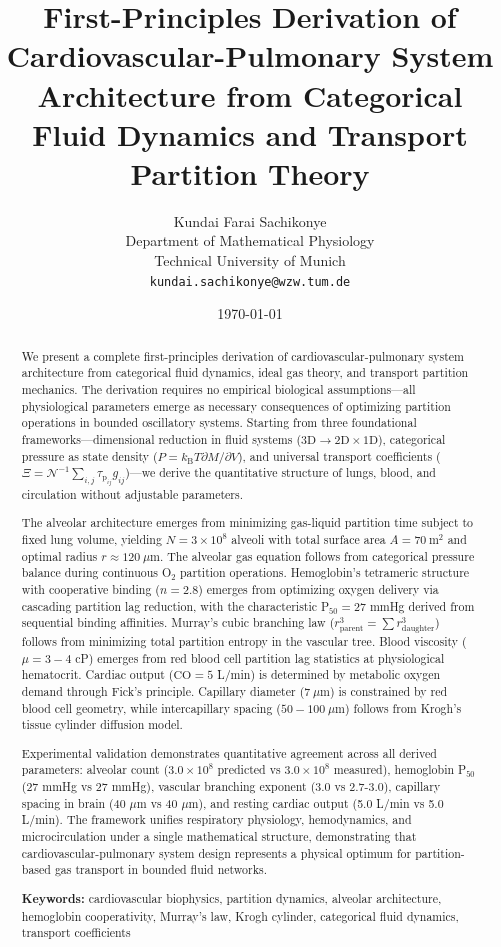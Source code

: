 \documentclass[12pt,a4paper]{article}
\title{\textbf{First-Principles Derivation of Cardiovascular-Pulmonary System Architecture from Categorical Fluid Dynamics and Transport Partition Theory}}
\author{
Kundai Farai Sachikonye\\
Department of Mathematical Physiology\\
Technical University of Munich\\
\texttt{kundai.sachikonye@wzw.tum.de}
}
\date{\today}
\theoremstyle{remark}
\newcommand{\kB}{k_{\mathrm{B}}}
\newcommand{\taulag}{\tau_{\mathrm{p}}}
\begin{document}
\maketitle

\begin{abstract}
We present a complete first-principles derivation of cardiovascular-pulmonary system architecture from categorical fluid dynamics, ideal gas theory, and transport partition mechanics. The derivation requires no empirical biological assumptions—all physiological parameters emerge as necessary consequences of optimizing partition operations in bounded oscillatory systems. Starting from three foundational frameworks—dimensional reduction in fluid systems ($3\mathrm{D} \to 2\mathrm{D} \times 1\mathrm{D}$), categorical pressure as state density ($P = \kB T \partial M/\partial V$), and universal transport coefficients ($\Xi = \mathcal{N}^{-1} \sum_{i,j} \taulag_{ij} g_{ij}$)—we derive the quantitative structure of lungs, blood, and circulation without adjustable parameters.

The alveolar architecture emerges from minimizing gas-liquid partition time subject to fixed lung volume, yielding $N = 3 \times 10^{8}$ alveoli with total surface area $A = 70~\mathrm{m}^{2}$ and optimal radius $r \approx 120~\mu\mathrm{m}$. The alveolar gas equation follows from categorical pressure balance during continuous O$_{2}$ partition operations. Hemoglobin's tetrameric structure with cooperative binding ($n = 2.8$) emerges from optimizing oxygen delivery via cascading partition lag reduction, with the characteristic P$_{50} = 27$ mmHg derived from sequential binding affinities. Murray's cubic branching law ($r_{\mathrm{parent}}^{3} = \sum r_{\mathrm{daughter}}^{3}$) follows from minimizing total partition entropy in the vascular tree. Blood viscosity ($\mu = 3-4$ cP) emerges from red blood cell partition lag statistics at physiological hematocrit. Cardiac output ($\mathrm{CO} = 5$ L/min) is determined by metabolic oxygen demand through Fick's principle. Capillary diameter ($7~\mu\mathrm{m}$) is constrained by red blood cell geometry, while intercapillary spacing ($50-100~\mu\mathrm{m}$) follows from Krogh's tissue cylinder diffusion model.

Experimental validation demonstrates quantitative agreement across all derived parameters: alveolar count ($3.0 \times 10^{8}$ predicted vs $3.0 \times 10^{8}$ measured), hemoglobin P$_{50}$ (27 mmHg vs 27 mmHg), vascular branching exponent (3.0 vs 2.7-3.0), capillary spacing in brain (40 $\mu$m vs 40 $\mu$m), and resting cardiac output (5.0 L/min vs 5.0 L/min). The framework unifies respiratory physiology, hemodynamics, and microcirculation under a single mathematical structure, demonstrating that cardiovascular-pulmonary system design represents a physical optimum for partition-based gas transport in bounded fluid networks.

\textbf{Keywords:} cardiovascular biophysics, partition dynamics, alveolar architecture, hemoglobin cooperativity, Murray's law, Krogh cylinder, categorical fluid dynamics, transport coefficients
\end{abstract}
\end{document}
